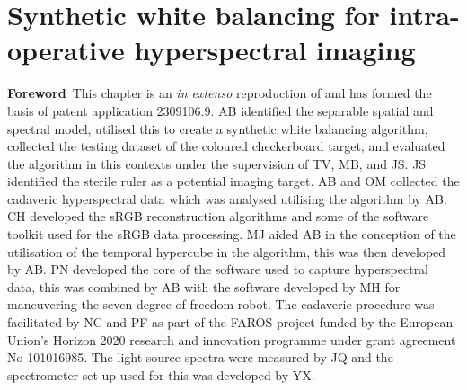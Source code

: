 % 
\chapter[Synthetic white balancing]{Synthetic white balancing for intra-operative hyperspectral imaging}
\label{chap:SWB}

\begin{center}
\begin{minipage}[b]{0.9\linewidth}
\small
\textbf{Foreword\,}
This chapter is an \emph{in extenso} reproduction of \cite{Bahl2023} and has formed the basis of patent application 2309106.9. 
\newline
AB identified the separable spatial and spectral model, utilised this to create a synthetic white balancing algorithm, collected the testing dataset of the coloured checkerboard target, and evaluated the algorithm in this contexts under the supervision of TV, MB, and JS. JS identified the sterile ruler as a potential imaging target. AB and OM collected the cadaveric hyperspectral data which was analysed utilising the algorithm by AB. CH developed the sRGB reconstruction algorithms and some of the software toolkit used for the sRGB data processing. MJ aided AB in the conception of the utilisation of the temporal hypercube in the algorithm, this was then developed by AB. PN developed the core of the software used to capture hyperspectral data, this was combined by AB with the software developed by MH for maneuvering the seven degree of freedom robot. The cadaveric procedure was facilitated by NC and PF as part of the FAROS project funded by the European Union’s Horizon 2020 research and innovation programme under grant agreement No 101016985. The light source spectra were measured by JQ and the spectrometer set-up used for this was developed by YX. 
\end{minipage}
\end{center}

\minitoc



